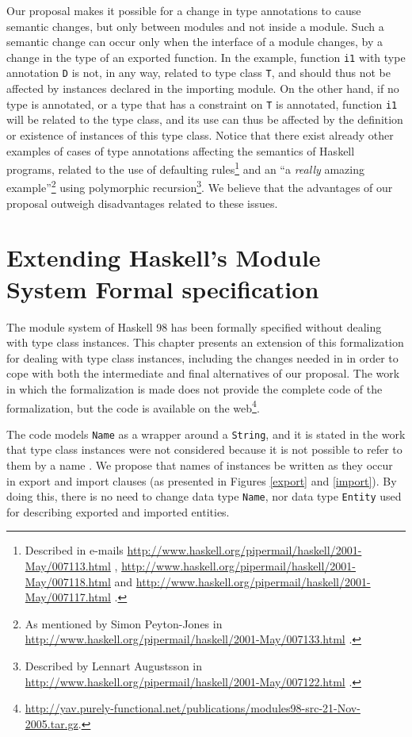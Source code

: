 \documentclass[msc]{ppgccufmg}
\begin{document}
{Our proposal makes it possible for a change in type annotations to
cause semantic changes, but only between modules and not inside a
module. Such a semantic change can occur only when the interface of a
module changes, by a change in the type of an exported function. In
the example, function \texttt{i1} with type annotation \texttt{D} is
not, in any way, related to type class \texttt{T}, and should thus not
be affected by instances declared in the importing module.  On the
other hand, if no type is annotated, or a type that has a constraint
on \texttt{T} is annotated, function \texttt{i1} will be related to the
type class, and its use can thus be affected by the definition or
existence of instances of this type class.  Notice that there exist
already other examples of cases of type annotations affecting the
semantics of Haskell programs, related to the use of defaulting
rules\footnote{Described in e-mails
  \url{http://www.haskell.org/pipermail/haskell/2001-May/007113.html}
  ,
  \url{http://www.haskell.org/pipermail/haskell/2001-May/007118.html}
  and
  \url{http://www.haskell.org/pipermail/haskell/2001-May/007117.html}
  .} and an ``a \textit{really\/} amazing example''\footnote{As
  mentioned by Simon Peyton-Jones in
  \url{http://www.haskell.org/pipermail/haskell/2001-May/007133.html}
  .} using polymorphic recursion\footnote{Described by Lennart
  Augustsson in
  \url{http://www.haskell.org/pipermail/haskell/2001-May/007122.html}
  .}.  We believe that the advantages of our proposal outweigh
disadvantages related to these issues.

\chapter[Extending the Module System specification]{Extending Haskell's Module System Formal specification}
\label{formal}
The module system of Haskell 98 has been formally specified
\citep{formal} without dealing with type class instances. This chapter
presents an extension of this formalization for dealing with type
class instances, including the changes needed in \citep{formal} in
order to cope with both the intermediate and final alternatives of our
proposal.  The work in which the formalization is made does not
provide the complete code of the formalization, but the code is
available on the
web\footnote{\url{http://yav.purely-functional.net/publications/modules98-src-21-Nov-2005.tar.gz}.}.

The code models \texttt{Name} as a wrapper around a \texttt{String},
and it is stated in the work that type class instances were not
considered because it is not possible to refer to them by a
name \citep[section~3.1]{formal}. We propose that names of instances be
written as they occur in export and import clauses (as presented in
Figures \ref{export} and \ref{import}).  By doing this, there is no
need to change data type \texttt{Name}, nor data type \texttt{Entity}
used for describing exported and imported entities.

}
\end{document}
